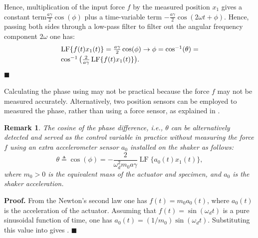 \documentclass[lettersize,journal]{IEEEtran}
\DeclareMathOperator{\LF}{LF}
\newtheorem{remark}{Remark}
\begin{document}
Hence, multiplication of the input force $f$ by the measured position $x_1$ gives a constant term$\frac{a\gamma}{2}\cos(\phi)$ plus a time-variable term $-\frac{a\gamma}{2}\cos(2\omega t +\phi)$. Hence, passing both sides through a low-pass filter to filter out the angular frequency component $2\omega$ one has:
\begin{equation}
\begin{array}{l}
\LF \{f(t)x_1(t) \}=\frac{a\gamma}{2}\cos(\phi)  \rightarrow  \phi =\cos^{-1} (\theta)= \vspace{0.1cm} \\ 
\cos^{-1} \big( \frac{2} {a\gamma}\LF \{f(t)x_1(t) \} \big) .
\end{array}
\label{E_multiple_avant_filter}
\end{equation}
 $\blacksquare$


 Calculating the phase using  may not be practical because the force $f$ may not be measured accurately. Alternatively, two position sensors can be employed to measured the phase, rather than using a force sensor, as explained in .
\begin{remark} \label{R_practical_phase_detection}
The cosine of the phase difference, {\em i.e.}, $\theta$ can be alternatively detected and served as the control variable in practice without measuring the force $f$ using an extra accelerometer sensor $a_0$ installed on the shaker as follows:
\begin{equation}
\theta\triangleq \cos(\phi) = -\frac{2} {\omega_d^2 m_0a\gamma}\LF \{a_0(t) x_1(t) \} ,
\label{E_phase_measured}
\end{equation}
where $m_0>0$ is the equivalent mass of the actuator and specimen, and $a_0$ is the shaker acceleration.
\end{remark} 
\noindent \textbf{Proof.}
From the Newton's second law one has $f(t)=m_0 a_0(t)$, where $a_0(t)$ is the acceleration of the actuator. Assuming that $f(t)=\sin(\omega_d t)$ is a pure sinusoidal function of time, one has $a_0(t)=(1/m_0)\sin(\omega_d t)$. Substituting this value into  gives .
$\blacksquare$
\end{document}
